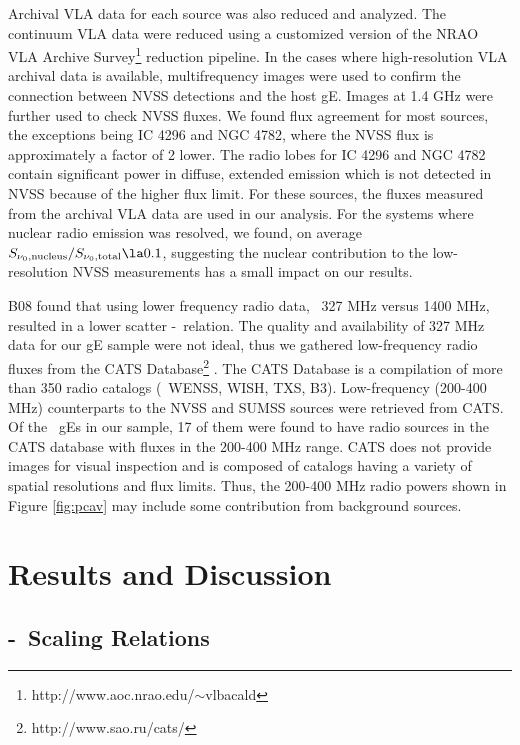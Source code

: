 \documentclass[12pt, preprint]{aastex}
\begin{document}
Archival VLA data for each source was also reduced and analyzed. The
continuum VLA data were reduced using a customized version of the NRAO
VLA Archive Survey\footnote{http://www.aoc.nrao.edu/$\sim$vlbacald}
reduction pipeline. In the cases where high-resolution VLA archival
data is available, multifrequency images were used to confirm the
connection between NVSS detections and the host gE. Images at 1.4 GHz
were further used to check NVSS fluxes. We found flux agreement for
most sources, the exceptions being IC 4296 and NGC 4782, where the
NVSS flux is approximately a factor of 2 lower. The radio lobes for IC
4296 and NGC 4782 contain significant power in diffuse, extended
emission which is not detected in NVSS because of the higher flux
limit. For these sources, the fluxes measured from the archival VLA
data are used in our analysis. For the systems where nuclear radio
emission was resolved, we found, on average
$S_{\nu_0,\mathrm{nucleus}} / S_{\nu_0,\mathrm{total}} \la 0.1$,
suggesting the nuclear contribution to the low-resolution NVSS
measurements has a small impact on our results.

B08 found that using lower frequency radio data, \ie\ 327 MHz versus
1400 MHz, resulted in a lower scatter \pjet-\prad\ relation. The
quality and availability of 327 MHz data for our gE sample were not
ideal, thus we gathered low-frequency radio fluxes from the CATS
Database\footnote{http://www.sao.ru/cats/} \citep{cats}. The CATS
Database is a compilation of more than 350 radio catalogs (\eg\ WENSS,
WISH, TXS, B3). Low-frequency (200-400 MHz) counterparts to the NVSS
and SUMSS sources were retrieved from CATS. Of the \samp\ gEs in our
sample, 17 of them were found to have radio sources in the CATS
database with fluxes in the 200-400 MHz range. CATS does not provide
images for visual inspection and is composed of catalogs having a
variety of spatial resolutions and flux limits. Thus, the 200-400 MHz
radio powers shown in Figure \ref{fig:pcav} may include some
contribution from background sources.

\section{Results and Discussion}
\label{sec:r&d}

\subsection{\pjet-\prad\ Scaling Relations}
\label{sec:relation}
\end{document}
